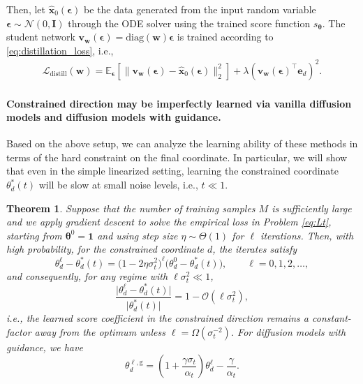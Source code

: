 \documentclass{article}
\theoremstyle{plain}
\newtheorem{theorem}{Theorem}[section]
\theoremstyle{definition}
\theoremstyle{remark}
\begin{document}
Then, let $\hat{\bm x}_0(\boldsymbol{\epsilon})$ be the data generated from the input random variable $\boldsymbol{\epsilon}\sim \mathcal{N}(0,\bm I)$ through the ODE solver using the trained score function $s_{\bm \theta}$. The student network $\bm v_{\bm w}(\boldsymbol{\epsilon})=\mathrm{diag}(\bm w)\boldsymbol{\epsilon}$ is trained according to \eqref{eq:distillation_loss}, i.e.,
\begin{align*}
 \mathcal{L}_{\mathrm{distill}}(\bm w)= \mathbb E_{\boldsymbol{\epsilon}}[\|\bm v_{\bm w}(\boldsymbol{\epsilon})-\hat{\bm x}_0(\boldsymbol{\epsilon})\|_2^2] + \lambda (\bm v_{\bm w}(\boldsymbol{\epsilon})^\top \bm e_d)^2.
\end{align*}

\paragraph{Constrained direction may be imperfectly learned via vanilla diffusion models and diffusion models with guidance.} Based on the above setup, we can analyze the learning ability of these methods in terms of the hard constraint on the final coordinate. In particular, we will show that even in the simple linearized setting, learning the constrained coordinate $\theta_d^*(t)$ will be slow at small noise levels, i.e., $t\ll 1$.

\begin{theorem}\label{thm:sampling}
    Suppose that the number of training samples $M$ is sufficiently large and we apply gradient descent to solve the empirical loss in Problem \eqref{eq:Lt}, starting from $\bm \theta^0 = \bm{1}$ and using step size $\eta\sim \Theta(1)$ for $\ell$ iterations. Then, with high probability, for the constrained coordinate \(d\), the iterates satisfy
\[
\theta_d^{\ell} - \theta_d^*(t) = \bigl(1-2\eta\sigma_t^2\bigr)^{\ell}\bigl(\theta_d^{0}-\theta_d^*(t)\bigr),
\qquad \ell=0,1,2,\dots,
\]
and consequently, for any regime with \(\ell\sigma_t^2 \ll 1\),
\[
\frac{\lvert \theta_d^{\ell} - \theta_d^*(t)\rvert}{\lvert \theta_d^*(t)\rvert}
= 1 - \mathcal{O}(\ell\sigma_t^2),
\]
i.e., the learned score coefficient in the constrained direction remains a \emph{constant-factor} away from the optimum unless \(\ell=\Omega(\sigma_t^{-2})\).
For diffusion models with guidance, we have
\[
\theta_d^{\ell,\mathrm{g}}
=
\left(1+\frac{\gamma\sigma_t}{\alpha_t}\right)\theta_d^\ell
-
\frac{\gamma}{\alpha_t}.
\]
\end{theorem}
\end{document}
